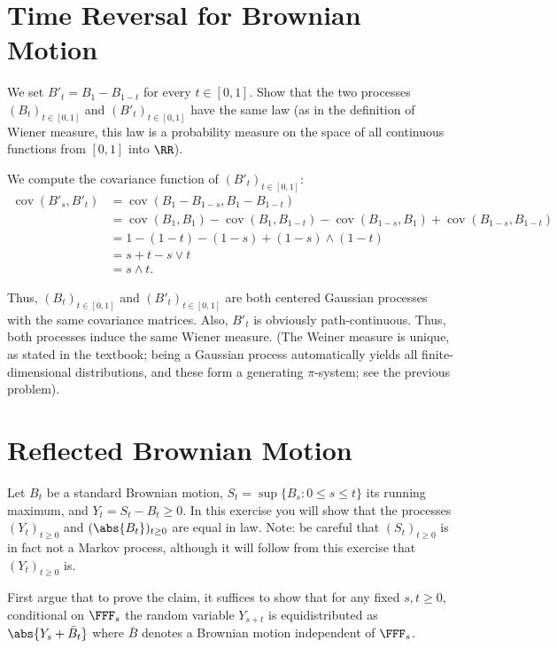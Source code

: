 \documentclass{scrartcl}
\DeclareMathOperator{\cov}{cov}
\begin{document}
\section{Time Reversal for Brownian Motion}
\begin{prob*}
    We set $B'_t = B_1 - B_{1-t}$ for every $t \in [0, 1]$. Show that the two processes $(B_t)_{t \in [0, 1]}$ and $(B'_t)_{t \in [0, 1]}$ have the same law (as in the definition of Wiener measure, this law is a probability measure on the space of all continuous functions from $[0, 1]$ into $\RR$).
\end{prob*}

We compute the covariance function of $(B'_t)_{t\in [0,1]}$:
\begin{align*}
    \cov(B'_s, B'_t) &= \cov(B_1 - B_{1-s}, B_1 - B_{1-t}) \\
    &= \cov(B_1, B_1) - \cov(B_1, B_{1-t}) - \cov(B_{1-s}, B_1) + \cov(B_{1-s}, B_{1-t}) \\
    &= 1 - (1 - t) - (1 - s) + (1-s) \wedge (1-t) \\
    &= s + t - s \vee t\\
    &= s \wedge t.
\end{align*}

Thus, $(B_t)_{t\in [0,1]}$ and $(B'_t)_{t\in [0,1]}$ are both centered Gaussian processes with the same covariance matrices. Also, $B'_t$ is obviously path-continuous. Thus, both processes induce the same Wiener measure. (The Weiner measure is unique, as stated in the textbook; being a Gaussian process automatically yields all finite-dimensional distributions, and these form a generating $\pi$-system; see the previous problem).

\section{Reflected Brownian Motion}
\begin{prob*}
    Let $B_t$ be a standard Brownian motion, $S_t = \sup\{B_s: 0 \leq s \leq t\}$ its running maximum, and $Y_t = S_t - B_t \geq 0$. In this exercise you will show that the processes $(Y_t)_{t \geq 0}$ and $(\abs{B_t})_{t \geq 0}$ are equal in law. Note: be careful that $(S_t)_{t \geq 0}$ is in fact not a Markov process, although it will follow from this exercise that $(Y_t)_{t \geq 0}$ is.
\end{prob*}
\begin{prob}
    First argue that to prove the claim, it suffices to show that for any fixed $s, t \geq 0$, conditional on $\FFF_s$ the random variable $Y_{s+t}$ is equidistributed as $\abs{Y_s + \bar{B}_t}$ where $\bar{B}$ denotes a Brownian motion independent of $\FFF_s$.
\end{prob}
\end{document}
